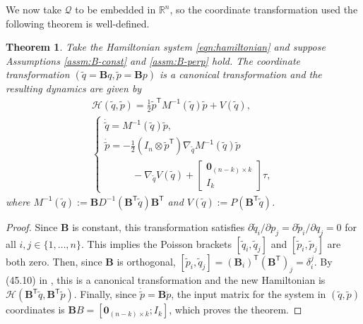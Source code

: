 \documentclass[journal,twoside,onecolumn,draftclsnofoot,web]{ieeecolor}
\newtheorem{thm}{Theorem}%
\newcommand*{\tpose}{^\mathsf{T}}
\newcommand*{\R}{\mathbb{R}}
\newcommand*{\Minv}{M^\mathsf{-1}}
\newcommand*{\Id}[1]{I_{#1}}
\newcommand*{\Zmat}[1]{\bm{0}_{#1}}
\newcommand*{\simpleB}{\begin{bmatrix}\Zmat{(n-k)\times k}\\ \Id{k}\end{bmatrix}}
\begin{document}
We now take \(\mathcal{Q}\) to be embedded in \(\R^n\), so the coordinate
transformation used the following theorem is well-defined.

\begin{thm}\label{thm:simply-actuated}
    Take the Hamiltonian system \eqref{eqn:hamiltonian} and suppose
    Assumptions \ref{assm:B-const} and \ref{assm:B-perp} hold.
    The coordinate transformation
    \(\left(\tilde{q} = \mathbf{B}q, \tilde{p} = \mathbf{B}p\right)\)
    is a canonical transformation and the resulting dynamics are given by 
    \begin{gather}\label{eqn:simple-hamiltonian}
        \mathcal{H}(\tilde{q},\tilde{p}) = 
        \frac{1}{2} \tilde{p}\tpose \Minv(\tilde{q}) \tilde{p} + V(\tilde{q})
        , \\
       \begin{cases}
           \dot{\tilde{q}} = \Minv(\tilde{q})\tilde{p}
           , \\
           \dot{\tilde{p}} = -\frac{1}{2} (\Id{n} \otimes \tilde{p}\tpose)
           \nabla_{\tilde{q}} \Minv(\tilde{q}) \tilde{p} \\
           \phantom{---} - \nabla_{\tilde{q}} V(\tilde{q}) + \simpleB \tau
            ,
        \end{cases} \nonumber
    \end{gather}
    where 
    \(\Minv(\tilde{q}) := 
    \mathbf{B}D^{-1}(\mathbf{B}\tpose \tilde{q})\mathbf{B}\tpose\)
    and
    \(V(\tilde{q}) := P(\mathbf{B}\tpose \tilde{q})\).
\end{thm}
\begin{proof}
    Since \(\mathbf{B}\) is constant, this transformation satisfies
    \(\partial\tilde{q}_i/\partial p_j = \partial\tilde{p}_i/\partial q_j = 0\) for all 
    \(i,j \in \{1,\ldots,n\}\).
    This implies the Poisson brackets \([\tilde{q}_i, \tilde{q}_j]\)
    and \([\tilde{p}_i,\tilde{p}_j]\) are both zero.
    Then, since \(\mathbf{B}\) is orthogonal, 
    \([\tilde{p}_i, \tilde{q}_j] = (\mathbf{B}_i)\tpose (\mathbf{B}\tpose)_j
        = \delta_i^j\).
    By (45.10) in \cite{landau_mechanics}, this is a canonical transformation
    and the new Hamiltonian is
    \(\mathcal{H}(\mathbf{B}\tpose \tilde{q}, \mathbf{B}\tpose \tilde{p})\).
    Finally, since \(\dot{\tilde{p}} = \mathbf{B} \dot{p}\), the input
    matrix for the system in \((\tilde{q},\tilde{p})\) coordinates is
    \(\mathbf{B}B = [\Zmat{(n-k)\times k}; \Id{k}]\), which proves the theorem.
\end{proof}
\end{document}

